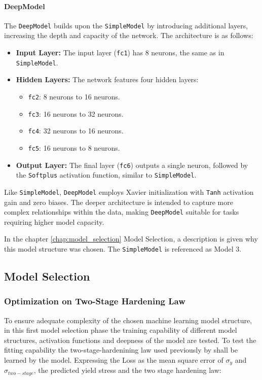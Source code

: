 \paragraph{DeepModel}
The \texttt{DeepModel} builds upon the \texttt{SimpleModel} by introducing additional layers, increasing the depth and capacity of the network. The architecture is as follows:
\begin{itemize}
    \item \textbf{Input Layer:} The input layer (\texttt{fc1}) has 8 neurons, the same as in \texttt{SimpleModel}.
    \item \textbf{Hidden Layers:} The network features four hidden layers:
    \begin{itemize}
        \item \texttt{fc2}: 8 neurons to 16 neurons.
        \item \texttt{fc3}: 16 neurons to 32 neurons.
        \item \texttt{fc4}: 32 neurons to 16 neurons.
        \item \texttt{fc5}: 16 neurons to 8 neurons.
    \end{itemize}
    \item \textbf{Output Layer:} The final layer (\texttt{fc6}) outputs a single neuron, followed by the \texttt{Softplus} activation function, similar to \texttt{SimpleModel}.
\end{itemize}
Like \texttt{SimpleModel}, \texttt{DeepModel} employs Xavier initialization with \texttt{Tanh} activation gain and zero biases. The deeper architecture is intended to capture more complex relationships within the data, making \texttt{DeepModel} suitable for tasks requiring higher model capacity.

In the chapter \ref{chap:model_selection} Model Selection, a description is given why this model structure was chosen. The \texttt{SimpleModel} is referenced as Model 3.





\subsection{Model Selection}

\subsubsection{Optimization on Two-Stage Hardening Law}

To ensure adequate complexity of the chosen machine learning model structure, in this first model selection phase the training capability of different model structures, activation functions and deepness of the model are tested.
To test the fitting capability the two-stage-hardenining law used previously by \citet{Tancogne-Ind} shall be learned by the model.
Expressing the Loss as the mean square error of $\sigma_y$ and $\sigma_{two-stage}$, the predicted yield stress and the two stage hardening law:

